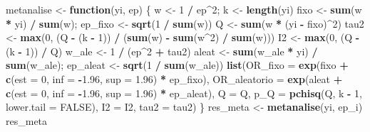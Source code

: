 \documentclass[
]{book}
\newenvironment{Shaded}{\begin{snugshade}}{\end{snugshade}}
\newcommand{\AttributeTok}[1]{\textcolor[rgb]{0.13,0.29,0.53}{#1}}
\newcommand{\ConstantTok}[1]{\textcolor[rgb]{0.56,0.35,0.01}{#1}}
\newcommand{\ControlFlowTok}[1]{\textcolor[rgb]{0.13,0.29,0.53}{\textbf{#1}}}
\newcommand{\DecValTok}[1]{\textcolor[rgb]{0.00,0.00,0.81}{#1}}
\newcommand{\FloatTok}[1]{\textcolor[rgb]{0.00,0.00,0.81}{#1}}
\newcommand{\FunctionTok}[1]{\textcolor[rgb]{0.13,0.29,0.53}{\textbf{#1}}}
\newcommand{\NormalTok}[1]{#1}
\newcommand{\OtherTok}[1]{\textcolor[rgb]{0.56,0.35,0.01}{#1}}
\newcommand{\SpecialCharTok}[1]{\textcolor[rgb]{0.81,0.36,0.00}{\textbf{#1}}}
\begin{document}
\begin{Shaded}
\begin{Highlighting}[]
\NormalTok{metanalise }\OtherTok{\textless{}{-}} \ControlFlowTok{function}\NormalTok{(yi, ep) \{}
\NormalTok{  w }\OtherTok{\textless{}{-}} \DecValTok{1} \SpecialCharTok{/}\NormalTok{ ep}\SpecialCharTok{\^{}}\DecValTok{2}\NormalTok{; k }\OtherTok{\textless{}{-}} \FunctionTok{length}\NormalTok{(yi)}
\NormalTok{  fixo }\OtherTok{\textless{}{-}} \FunctionTok{sum}\NormalTok{(w }\SpecialCharTok{*}\NormalTok{ yi) }\SpecialCharTok{/} \FunctionTok{sum}\NormalTok{(w); ep\_fixo }\OtherTok{\textless{}{-}} \FunctionTok{sqrt}\NormalTok{(}\DecValTok{1} \SpecialCharTok{/} \FunctionTok{sum}\NormalTok{(w))}
\NormalTok{  Q }\OtherTok{\textless{}{-}} \FunctionTok{sum}\NormalTok{(w }\SpecialCharTok{*}\NormalTok{ (yi }\SpecialCharTok{{-}}\NormalTok{ fixo)}\SpecialCharTok{\^{}}\DecValTok{2}\NormalTok{)}
\NormalTok{  tau2 }\OtherTok{\textless{}{-}} \FunctionTok{max}\NormalTok{(}\DecValTok{0}\NormalTok{, (Q }\SpecialCharTok{{-}}\NormalTok{ (k }\SpecialCharTok{{-}} \DecValTok{1}\NormalTok{)) }\SpecialCharTok{/}\NormalTok{ (}\FunctionTok{sum}\NormalTok{(w) }\SpecialCharTok{{-}} \FunctionTok{sum}\NormalTok{(w}\SpecialCharTok{\^{}}\DecValTok{2}\NormalTok{) }\SpecialCharTok{/} \FunctionTok{sum}\NormalTok{(w)))}
\NormalTok{  I2 }\OtherTok{\textless{}{-}} \FunctionTok{max}\NormalTok{(}\DecValTok{0}\NormalTok{, (Q }\SpecialCharTok{{-}}\NormalTok{ (k }\SpecialCharTok{{-}} \DecValTok{1}\NormalTok{)) }\SpecialCharTok{/}\NormalTok{ Q)}
\NormalTok{  w\_ale }\OtherTok{\textless{}{-}} \DecValTok{1} \SpecialCharTok{/}\NormalTok{ (ep}\SpecialCharTok{\^{}}\DecValTok{2} \SpecialCharTok{+}\NormalTok{ tau2)}
\NormalTok{  aleat }\OtherTok{\textless{}{-}} \FunctionTok{sum}\NormalTok{(w\_ale }\SpecialCharTok{*}\NormalTok{ yi) }\SpecialCharTok{/} \FunctionTok{sum}\NormalTok{(w\_ale); ep\_aleat }\OtherTok{\textless{}{-}} \FunctionTok{sqrt}\NormalTok{(}\DecValTok{1} \SpecialCharTok{/} \FunctionTok{sum}\NormalTok{(w\_ale))}
  \FunctionTok{list}\NormalTok{(}\AttributeTok{OR\_fixo =} \FunctionTok{exp}\NormalTok{(fixo }\SpecialCharTok{+} \FunctionTok{c}\NormalTok{(}\AttributeTok{est =} \DecValTok{0}\NormalTok{, }\AttributeTok{inf =} \SpecialCharTok{{-}}\FloatTok{1.96}\NormalTok{, }\AttributeTok{sup =} \FloatTok{1.96}\NormalTok{) }\SpecialCharTok{*}\NormalTok{ ep\_fixo),}
       \AttributeTok{OR\_aleatorio =} \FunctionTok{exp}\NormalTok{(aleat }\SpecialCharTok{+} \FunctionTok{c}\NormalTok{(}\AttributeTok{est =} \DecValTok{0}\NormalTok{, }\AttributeTok{inf =} \SpecialCharTok{{-}}\FloatTok{1.96}\NormalTok{, }\AttributeTok{sup =} \FloatTok{1.96}\NormalTok{) }\SpecialCharTok{*}\NormalTok{ ep\_aleat),}
       \AttributeTok{Q =}\NormalTok{ Q, }\AttributeTok{p\_Q =} \FunctionTok{pchisq}\NormalTok{(Q, k }\SpecialCharTok{{-}} \DecValTok{1}\NormalTok{, }\AttributeTok{lower.tail =} \ConstantTok{FALSE}\NormalTok{), }\AttributeTok{I2 =}\NormalTok{ I2, }\AttributeTok{tau2 =}\NormalTok{ tau2)}
\NormalTok{\}}
\NormalTok{res\_meta }\OtherTok{\textless{}{-}} \FunctionTok{metanalise}\NormalTok{(yi, ep\_i)}
\NormalTok{res\_meta}
\end{Highlighting}
\end{Shaded}
\end{document}
